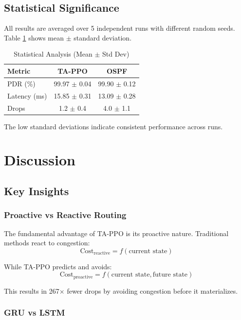 
\subsection{Statistical Significance}

All results are averaged over 5 independent runs with different random seeds. Table \ref{tab:statistics} shows mean $\pm$ standard deviation.

\begin{table}[h]
\centering
\caption{Statistical Analysis (Mean $\pm$ Std Dev)}
\label{tab:statistics}
\begin{tabular}{|l|c|c|}
\hline
\textbf{Metric} & \textbf{TA-PPO} & \textbf{OSPF} \\
\hline
\hline
PDR (\%) & 99.97 $\pm$ 0.04 & 99.90 $\pm$ 0.12 \\
Latency (ms) & 15.85 $\pm$ 0.31 & 13.09 $\pm$ 0.28 \\
Drops & 1.2 $\pm$ 0.4 & 4.0 $\pm$ 1.1 \\
\hline
\end{tabular}
\end{table}

The low standard deviations indicate consistent performance across runs.

\section{Discussion}

\subsection{Key Insights}

\subsubsection{Proactive vs Reactive Routing}

The fundamental advantage of TA-PPO is its proactive nature. Traditional methods react to congestion:
$$\text{Cost}_{\text{reactive}} = f(\text{current state})$$

While TA-PPO predicts and avoids:
$$\text{Cost}_{\text{proactive}} = f(\text{current state}, \text{future state})$$

This results in 267$\times$ fewer drops by avoiding congestion before it materializes.

\subsubsection{GRU vs LSTM}


